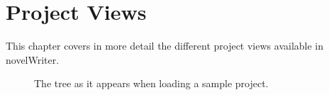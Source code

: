 \documentclass[a4paper,11pt,english]{sphinxmanual}
\begin{document}
\sphinxstepscope


\chapter{Project Views}
\label{\detokenize{usage_project:project-views}}\label{\detokenize{usage_project:a-ui-project}}\label{\detokenize{usage_project::doc}}
\sphinxAtStartPar
This chapter covers in more detail the different project views available in novelWriter.

\begin{figure}[htbp]
\centering
\capstart

\noindent{}
\caption{The  tree as it appears when loading a sample project.}\label{\detokenize{usage_project:id1}}\end{figure}
\end{document}
